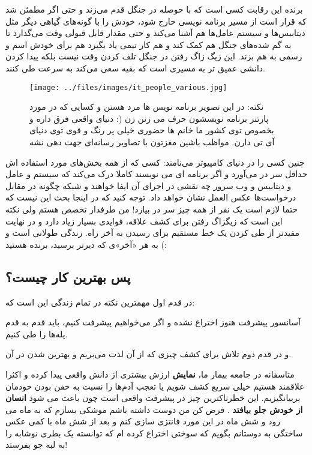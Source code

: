برنده این رقابت کسی است که با حوصله در جنگل قدم می‌زند و حتی اگر مطمئن شد که قرار است از مسیر برنامه نویسی خارج شود، خودش را با گونه‌های گیاهی دیگر مثل دیتابیس‌ها و سیستم عامل‌ها هم آشنا می‌کند و حتی مقدار قابل قبولی وقت می‌گذارد تا به گم شده‌های جنگل هم کمک کند و هم کار تیمی یاد بگیرد هم برای خودش اسم و رسمی به هم بزند. این زیگ زاگ رفتن در جنگل تلف کردن وقت نیست بلکه پیدا کردن دانشی عمیق تر به مسیری است که بقیه سعی می‌کند به سرعت طی کنند.
\begin{figure}[p]
	\begin{center}
		\texttt{[image: ../files/images/it\_people\_various.jpg]}
	\end{center}
\caption*{نکته: در این تصویر برنامه نویس ها مرد هستن و کسایی که در مورد پارتنر برنامه نویسشون حرف می زنن زن (: دنیای واقعی فرق داره و بخصوص توی کشور ما خانم ها حضوری خیلی پر رنگ و قوی توی دنیای آی تی دارن. مواظب باشین مغزتون با تصاویر رسانه‌ای جهت دهی نشه}
\end{figure}
چنین کسی را در دنیای کامپیوتر  می‌نامند: کسی که از همه بخش‌های مورد استفاده اش حداقل سر در می‌آورد و اگر برنامه ای می نویسند کاملا درک می‌کند که سیستم و عامل و دیتابیس و وب سرور چه نقشی در اجرای آن ایفا خواهند و شبکه چگونه در مقابل درخواست‌ها عکس العمل نشان خواهد داد. توجه کنید که در اینجا بحث این نیست که حتما لازم است یک نفر از همه چیز سر در بیارد! من طرفدار تخصص هستم ولی نکته این است که زیگزاگ رفتن برای کشف علاقه، فوایدی بسیار زیاد دارد و در نهایت مفیدتر از طی کردن یک خط مستقیم برای رسیدن به آخر راه. زندگی طولانی است و به هر «آخر»ی که دیرتر برسید، برنده هستید‌ (:
\subsection*{پس بهترین کار چیست؟}
در قدم اول مهمترین نکته در تمام زندگی این است که:

آسانسور پیشرفت هنوز اختراع نشده و اگر می‌خواهیم پیشرفت کنیم، باید قدم به قدم پله‌ها را طی کنیم.

و در قدم دوم تلاش برای کشف چیزی که از آن لذت می‌بریم و بهترین شدن در آن.

متاسفانه در جامعه بیمار ما،
\textbf{نمایش}
ارزش بیشتری از دانش واقعی پیدا کرده و اکثرا علاقمند هستیم خیلی سریع کشف شویم یا تعجب آدم‌ها را نسبت به خفن بودن خودمان بربیانگیزیم. این خطرناکترین چیز در پیشرفت واقعی است چون باعث می شود
\textbf{انسان از خودش جلو بیافتد}
.
فرض کن من دوست داشته باشم موشکی بسازم که به ماه می رود و شش ماه در این مورد فانتزی سازی کنم و بعد از شش ماه با کمی عکس ساختگی به دوستانم بگویم که سوختی اختراع کرده ام که توانسته یک بطری نوشابه را به لبه جو بفرستد! 

